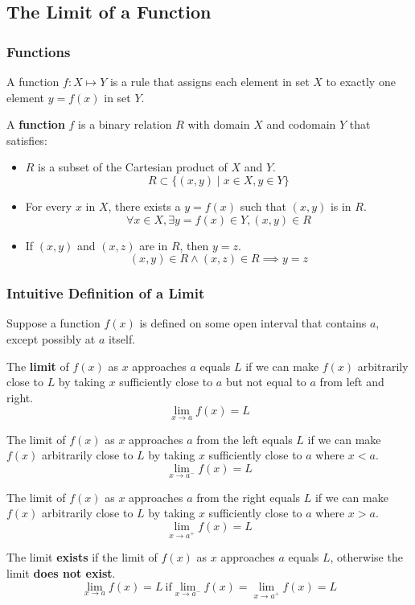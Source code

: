 \subsection{The Limit of a Function}

\subsubsection{Functions}
A function \(f:X\mapsto Y\) is a rule that assigns each element in set \(X\)
to exactly one element \(y=f(x)\) in set \(Y\).
\begin{definition}
    A \textbf{function} \(f\) is a binary relation \(R\) with domain \(X\) and
    codomain \(Y\) that satisfies:
    \begin{itemize}
        \item \(R\) is a subset of the Cartesian product of \(X\) and \(Y\).
        \[R\subset\{(x,y)\mid x\in X,y\in Y\}\]
        \item For every \(x\) in \(X\), there exists a \(y=f(x)\) such that
        \((x,y)\) is in \(R\).
        \[\forall x\in X,\exists y=f(x)\in Y,(x,y)\in R\]
        \item If \((x,y)\) and \((x,z)\) are in \(R\), then \(y=z\).
        \[(x,y)\in R \wedge (x,z)\in R \implies y=z\]
    \end{itemize}
\end{definition}

\subsubsection{Intuitive Definition of a Limit}
Suppose a function \(f(x)\) is defined on some open interval that contains
\(a\), except possibly at \(a\) itself.
\begin{definition}
    The \textbf{limit} of \(f(x)\) as \(x\) approaches \(a\) equals \(L\) if
    we can make \(f(x)\) arbitrarily close to \(L\) by taking \(x\)
    sufficiently close to \(a\) but not equal to \(a\) from left and right.
    \[\lim_{x\to a}f(x)=L\]
\end{definition}
\begin{definition}
    The limit of \(f(x)\) as \(x\) approaches \(a\) from the left equals \(L\)
    if we can make \(f(x)\) arbitrarily close to \(L\) by taking \(x\)
    sufficiently close to \(a\) where \(x<a\).
    \[\lim_{x\to a^-}f(x)=L\]
\end{definition}
\begin{definition}
    The limit of \(f(x)\) as \(x\) approaches \(a\) from the right equals
    \(L\) if we can make \(f(x)\) arbitrarily close to \(L\) by taking \(x\)
    sufficiently close to \(a\) where \(x>a\).
    \[\lim_{x\to a^+}f(x)=L\]
\end{definition}
The limit \textbf{exists} if the limit of \(f(x)\) as \(x\) approaches \(a\)
equals \(L\), otherwise the limit \textbf{does not exist}.
\[\lim_{x\to a}f(x)=L\ \text{if} \lim_{x\to a^-}f(x)=\lim_{x\to a^+}f(x)=L\]
